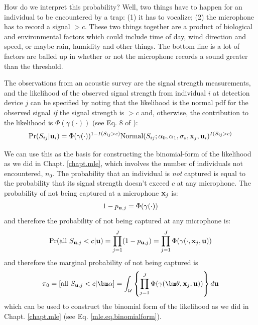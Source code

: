 How do we interpret this probability? Well, two things have to happen
for an individual to be encountered by a trap:
(1)  it has to  vocalize; (2)
the microphone has to record a signal $>c$. These two things
together are a product of biological and environmental factors which
could include time of day, wind direction and speed, or maybe rain,
humidity and other things. The bottom line is a lot of factors are
balled up in whether or not the microphone records a sound greater
than the threshold.  

The observations from an acoustic survey are the signal strength
measurements, and
the likelihood of the observed signal strength
from individual $i$ at detection
device $j$ can be specified by noting that
the
likelihood is the normal pdf for the observed signal {\it if} the
signal strength is $>c$ and, otherwise, the contribution to the
likelihood is $\Phi(\gamma(\cdot))$ (see Eq. 8 of \citet{efford_etal:2009ecol}):
\[
\Pr(S_{ij}| {\bf u}_{i} ) = \Phi( \gamma( \cdot) )^{1-I(S_{ij}>c)}
\mbox{Normal}(S_{ij};\alpha_{0},\alpha_{1},\sigma_{s},{\bf x}_{j},{\bf
u}_{i})^{I(S_{ij}>c)}
\]

We can use this as the basis for constructing the binomial-form of the
likelihood as we did in Chapt. \ref{chapt.mle}, which involves the
number of individuals not encountered, $n_{0}$.  The probability that
an individual is {\it not} captured is equal to the probability that
its signal strength doesn't exceed $c$ at any microphone.  The
probability of not being captured at a microphone ${\bf x}_{j}$ is:
\[
1-p_{{\bf u},j} = \Phi( \gamma(\cdot) )
\]
and therefore the probability of not being captured at any microphone is:
\[
\Pr(\mbox{all } S_{{\bf u},j} < c | {\bf u}) = \prod_{j=1}^{J} ( 1-p_{{\bf u},j} )
= \prod_{j=1}^{J} \Phi( \gamma(\cdot, {\bf x}_{j}, {\bf u}) )
\]
and therefore the marginal probability of not being captured is
\[
\pi_{0} = [ \mbox{all }  S_{{\bf u},j} < c | {\bm \alpha}] =
\int_{{\cal U}}
 \left\{
\prod_{j=1}^{J} \Phi( \gamma( {\bm \theta}, {\bf x}_{j}, {\bf u}) )
 \right\}
 d{\bf u}
\]
which can be used to construct the binomial form of the likelihood as
we did in Chapt. \ref{chapt.mle} (see Eq. \ref{mle.eq.binomialform}).




